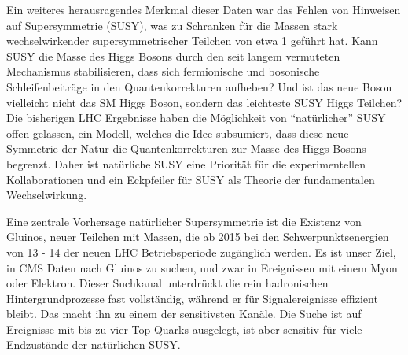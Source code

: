 \documentclass[11pt,a4paper]{article}
\begin{document}
Ein weiteres herausragendes Merkmal dieser Daten war das Fehlen von Hinweisen auf Supersymmetrie (SUSY), was zu Schranken f\"ur die Massen stark wechselwirkender supersymmetrischer Teilchen von etwa 1 \TeV gef\"uhrt hat.
Kann SUSY die Masse des Higgs Bosons durch den seit langem vermuteten Mechanismus stabilisieren, dass sich fermionische und bosonische Schleifenbeitr\"age in den Quantenkorrekturen aufheben?
Und ist das neue Boson vielleicht nicht das SM Higgs Boson, sondern das leichteste SUSY Higgs Teilchen?
Die bisherigen LHC Ergebnisse haben die M\"oglichkeit von ``nat\"urlicher'' SUSY offen gelassen, ein Modell, welches die Idee subsumiert,
dass diese neue Symmetrie der Natur die Quantenkorrekturen zur Masse des Higgs Bosons begrenzt. Daher ist nat\"urliche SUSY eine Priorit\"at f\"ur die experimentellen Kollaborationen und ein 
Eckpfeiler f\"ur SUSY als Theorie der fundamentalen Wechselwirkung. 

Eine zentrale Vorhersage nat\"urlicher Supersymmetrie ist die Existenz von Gluinos, neuer Teilchen mit Massen, die ab 2015 bei den Schwerpunktsenergien von 13 - 14 \TeV der neuen LHC Betriebsperiode zug\"anglich werden.
Es ist unser Ziel, in CMS Daten nach Gluinos zu suchen, und zwar in Ereignissen mit einem Myon oder Elektron.
Dieser Suchkanal unterdr\"uckt  die rein hadronischen Hintergrundprozesse fast vollst\"andig, w\"ahrend er f\"ur Signalereignisse effizient bleibt.
Das macht ihn zu einem der sensitivsten Kan\"ale.
Die Suche ist auf Ereignisse mit bis zu vier Top-Quarks ausgelegt, ist aber sensitiv f\"ur viele Endzust\"ande der nat\"urlichen SUSY.
\end{document}
